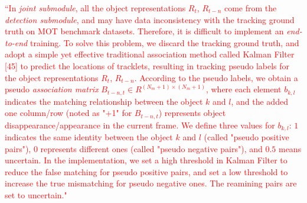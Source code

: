 \documentclass[12pt,journal,onecolumn]{IEEEtran}
\begin{document}
\textcolor{red}{
``In \emph{joint submodule}, all the object representations $R_t$, $R_{t-n}$ come from the \emph{detection submodule}, and may have data inconsistency with the tracking ground truth on MOT benchmark datasets.
Therefore, it is difficult to implement an \emph{end-to-end} training. 
To solve this problem, we discard the tracking ground truth, and adopt a simple yet effective traditional association method called Kalman Filter [45] to predict the locations of tracklets, resulting in tracking pseudo labels for the object representations $R_t$, $R_{t-n}$.
According to the pseudo labels, we obtain a pseudo \emph{association matrix} $B_{t-n,t} \in {R}^{(N_m+1) \times (N_m+1)}$, where each element $b_{k,l}$ indicates the matching relationship between the object $k$ and $l$, and the added one column/row (noted as "+1" for $B_{t-n,t}$) represents object disappearance/appearance in the current frame.
We define three values for $b_{k,l}$: $1$ indicates the same identity between the object $k$ and $l$ (called "pseudo positive pairs"), $0$ represents different ones (called "pseudo negative pairs"), and $0.5$ means uncertain.
In the implementation, we set a high threshold in Kalman Filter to reduce the false matching for pseudo positive pairs, and set a low threshold to increase the true mismatching for pseudo negative ones. The reamining pairs are set to uncertain."} 
\vspace{8pt} 


\vspace{8pt}


%
\end{document}
